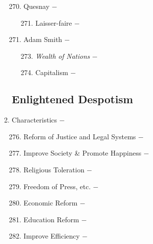 \documentclass[12pt]{article}
\begin{document}
\begin{enumerate}
\begin{enumerate}[label=\arabic{*}.]
\setcounter{enumii}{269}

\item Quesnay $-$ 

\begin{enumerate}[label=\arabic{*}.]
\setcounter{enumiii}{270}

\item Laisser-faire $-$ 

\end{enumerate}
\setcounter{enumii}{271}

\item Adam Smith $-$

\begin{enumerate}[label=\arabic{*}.]
\setcounter{enumiii}{272}

\item \textit{Wealth of Nations} $-$ 

\item Capitalism $-$

\end{enumerate}

\end{enumerate}
\setcounter{enumi}{274}

\subsection{Enlightened Despotism}

\item Characteristics $-$

\begin{enumerate}[label=\arabic{*}.]
\setcounter{enumii}{275}

\item Reform of Justice and Legal Systems $-$ 

\item Improve Society \& Promote Happiness $-$

\item Religious Toleration $-$

\item Freedom of Press, etc. $-$ 

\item Economic Reform $-$ 

\item Education Reform $-$ 

\item Improve Efficiency $-$ 


\end{enumerate}
\setcounter{enumi}{282}


\end{enumerate}
\end{document}
